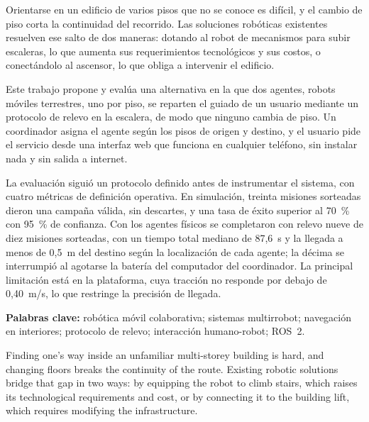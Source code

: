 
Orientarse en un edificio de varios pisos que no se conoce es difícil, y el cambio de
piso corta la continuidad del recorrido. Las soluciones
robóticas existentes resuelven ese salto de dos maneras: dotando al robot de mecanismos
para subir escaleras, lo que aumenta sus requerimientos tecnológicos y sus
costos, o conectándolo al ascensor, lo que obliga a intervenir el edificio.

Este trabajo propone y evalúa una alternativa en la que dos agentes, robots móviles
terrestres, uno por piso, se reparten el guiado de un usuario mediante un protocolo de
relevo en la escalera, de modo que ninguno cambia de piso. Un coordinador
asigna el agente según los pisos de origen y destino, y el usuario pide el servicio
desde una interfaz web que funciona en cualquier teléfono, sin instalar nada y sin
salida a internet.

La evaluación siguió un protocolo definido antes de instrumentar el sistema, con
cuatro métricas de definición operativa. En simulación, treinta misiones sorteadas
dieron una campaña válida, sin descartes, y una tasa de éxito superior al 70~\% con
95~\% de confianza. Con los agentes físicos se completaron con relevo
nueve de diez misiones sorteadas, con un tiempo total mediano de 87,6~s y la llegada a
menos de 0,5~m del destino según la localización de cada agente; la décima se
interrumpió al agotarse la batería del computador del coordinador. La principal
limitación está en la plataforma, cuya tracción no responde por debajo de 0,40~m/s, lo
que restringe la precisión de llegada.

\vspace{1em}
\textbf{Palabras clave:} robótica móvil colaborativa; sistemas multirrobot;
navegación en interiores; protocolo de relevo; interacción humano-robot; ROS~2.


Finding one's way inside an unfamiliar multi-storey building is hard, and changing
floors breaks the continuity of the route. Existing robotic solutions
bridge that gap in two ways: by equipping the robot to climb stairs, which raises its
technological requirements and cost, or by connecting it to the building
lift, which requires modifying the infrastructure.

